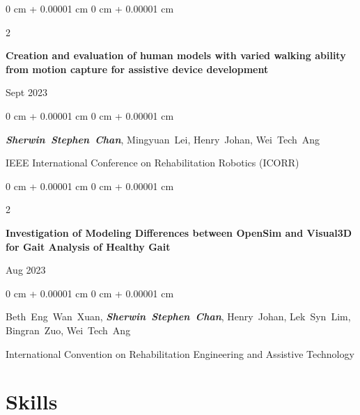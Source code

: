 \documentclass[10pt, letterpaper]{article}
\newenvironment{onecolentry}{
    \begin{adjustwidth}{
        0 cm + 0.00001 cm
    }{
        0 cm + 0.00001 cm
    }
}{
    \end{adjustwidth}
} %
\newenvironment{twocolentry}[2][]{
    \onecolentry
    \def\secondColumn{#2}
    \setcolumnwidth{\fill, 4.5 cm}
    \begin{paracol}{2}
}{
    \switchcolumn \raggedleft \secondColumn
    \end{paracol}
    \endonecolentry
} %
\begin{document}
        \begin{samepage}
            \begin{twocolentry}{
                Sept 2023
            }
                \textbf{Creation and evaluation of human models with varied walking ability from motion capture for assistive device development}
            \end{twocolentry}

            \vspace{0.10 cm}
            
            \begin{onecolentry}
                \mbox{\textbf{\textit{Sherwin Stephen Chan}}}, \mbox{Mingyuan Lei}, \mbox{Henry Johan}, \mbox{Wei Tech Ang}

                \vspace{0.10 cm}
                
        IEEE International Conference on Rehabilitation Robotics (ICORR)\end{onecolentry}
        \end{samepage}

        \vspace{0.2 cm}

        \begin{samepage}
            \begin{twocolentry}{
                Aug 2023
            }
                \textbf{Investigation of Modeling Differences between OpenSim and Visual3D for Gait Analysis of Healthy Gait}
            \end{twocolentry}

            \vspace{0.10 cm}
            
            \begin{onecolentry}
                \mbox{Beth Eng Wan Xuan}, \mbox{\textbf{\textit{Sherwin Stephen Chan}}}, \mbox{Henry Johan}, \mbox{Lek Syn Lim}, \mbox{Bingran Zuo}, \mbox{Wei Tech Ang}

                \vspace{0.10 cm}
                
        International Convention on Rehabilitation Engineering and Assistive Technology\end{onecolentry}
        \end{samepage}


    
    \section{Skills}
\end{document}
